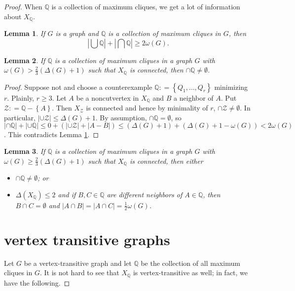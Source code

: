 \documentclass{amsbook}
\theoremstyle{plain}
\newtheorem{lemma}{Lemma}
\numberwithin{equation}{chapter}
\newcommand{\set}[1]{\left\{ #1 \right\}}
\newcommand{\card}[1]{\left|#1\right|}
\newcommand{\DefinedAs}{\mathrel{\mathop:}=}
\newcommand{\Q}{\mathbb{Q}}
\newcommand{\fancy}[1]{\mathcal{#1}}
\begin{document}
\begin{proof}
When $\Q$ is a collection of maximum cliques, we get a lot of information about $X_\Q$.  
\begin{lemma}\label{HajnalLemma}
If $G$ is a graph and $\Q$ is a collection of maximum cliques in $G$, then 
\[\card{\bigcup \Q} + \card{\bigcap \Q} \geq 2\omega(G).\]
\end{lemma}

\begin{lemma}\label{KostochkaCliqueGraph}
If $\Q$ is a collection of maximum cliques in a graph $G$ with $\omega(G) > \frac23 (\Delta(G) + 1)$ such that $X_\Q$ is connected, then $\cap \Q \neq \emptyset$. 
\end{lemma}
\begin{proof}
Suppose not and choose a counterexample $\Q \DefinedAs \set{Q_1, \ldots, Q_r}$
minimizing $r$. Plainly, $r \geq 3$. Let $A$ be a noncutvertex in $X_{\Q}$ and
$B$ a neighbor of $A$. Put $\fancy{Z} \DefinedAs \Q - \set{A}$. Then
$X_{\fancy{Z}}$ is connected and hence by minimality of $r$, $\cap \fancy{Z}
\neq \emptyset$. In particular, $\card{\cup \fancy{Z}} \leq \Delta(G) + 1$.
By assumption, $\cap\Q=\emptyset$, so $\card{\cap \Q} + \card{\cup \Q} \leq 0 +
(\card{\cup \fancy{Z}} + \card{A - B}) \leq
(\Delta(G) + 1) + (\Delta(G)+1 - \omega(G)) < 2\omega(G)$. This contradicts
Lemma \ref{HajnalLemma}.
\end{proof}

\begin{lemma}\label{TwoThirdsEqualityStructure}
If $\Q$ is a collection of maximum cliques in a graph $G$ with $\omega(G) \ge \frac23 (\Delta(G) + 1)$ such that $X_\Q$ is connected, then either 
\begin{itemize}
\item $\cap \Q \ne \emptyset$; or
\item $\Delta(X_\Q) \le 2$ and if $B, C \in \Q$ are different neighbors of $A \in \Q$, then $B \cap C = \emptyset$ and $\card{A \cap B} = \card{A \cap C} = \frac12 \omega(G)$.
\end{itemize}
\end{lemma}

\chapter*{vertex transitive graphs}
Let $G$ be a vertex-transitive graph and let $\Q$ be the collection of all
maximum cliques in $G$.  It is not hard to see that $X_\Q$ is vertex-transitive
as well; in fact, we have the following.


\end{proof}
\end{document}
